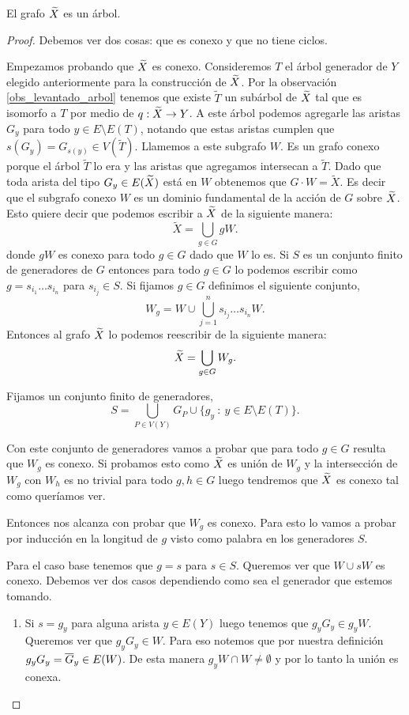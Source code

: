 \documentclass[tesis.tex]{subfiles}
\begin{document}
\begin{teo}[Serre]
	El grafo $\widetilde X$ es un árbol.
\end{teo}
\begin{proof}
	Debemos ver dos cosas: que es conexo y que no tiene ciclos.
	
	Empezamos probando que $\widetilde X$ es conexo.
	Consideremos $T$ el árbol generador de $Y$ elegido anteriormente para la construcción de $\widetilde X$. 
	Por la observación \ref{obs_levantado_arbol} tenemos que existe $\widetilde T$ un subárbol de $\widetilde X$ tal que es isomorfo a $T$ por medio de $q:\widetilde X \to Y$.
	A este árbol podemos agregarle las aristas $G_{y}$ para todo $y \in E \setminus E(T)$, notando que estas aristas cumplen que $s(G_{y}) = G_{s(y)} \in V(\widetilde T)$.
	Llamemos a este subgrafo $W$.
	Es un grafo conexo porque el árbol $\widetilde T$ lo era y las aristas que agregamos  intersecan a $\widetilde T$.	
	Dado que toda arista del tipo $G_y \in E(\widetilde X)$ está en $W$ obtenemos que $G \cdot W = \tilde X$.
	Es decir que el subgrafo conexo $W$ es un dominio fundamental de la acción de $G$ sobre $\widetilde X$.
	Esto quiere decir que podemos escribir a $\widetilde X$ de la siguiente manera:
	\[
		\tilde X = \bigcup_{g \in G} gW.
	\]
	donde $gW$ es conexo para todo $g \in G$ dado que $W$ lo es.
	Si $S$ es un conjunto finito de generadores de $G$ entonces para todo $g \in G$ lo podemos escribir como $g = s_{i_1} \dots s_{i_n}$ para $s_{i_j} \in S$.
	Si fijamos $g \in G$ definimos el siguiente conjunto,
	\[
		W_{g} = W \cup \bigcup_{j=1}^{n} s_{i_{j}}\dots s_{i_{n}}W.
	\]
	Entonces al grafo $\widetilde X$ lo podemos reescribir de la siguiente manera:
	\[
		\widetilde X =  \bigcup_{g \in G} W_{g}.
	\]
		
	
	Fijamos un conjunto finito de generadores, 
	\[
		S = \bigcup_{P \in V(Y)} G_{P} \cup \{ g_y \ : \ y \in E \setminus E(T) \}.   
	\] 
	
	Con este conjunto de generadores vamos a probar que para todo $g \in G$ resulta que $W_{g}$ es conexo.
	Si probamos esto como $\widetilde X$ es unión de $W_{g}$ y la intersección de $W_{g}$ con $W_{h}$ es no trivial para todo $g, h \in G$ luego tendremos que $\widetilde X$ es conexo tal como queríamos ver.
		
	
	Entonces nos alcanza con probar que $W_{g}$ es conexo.
	Para esto lo vamos a probar por inducción en la longitud de $g$ visto como palabra en los generadores $S$.
	
	Para el caso base tenemos que $g = s$ para $s \in S$.
	Queremos ver que $W \cup sW$ es conexo.
	Debemos ver dos casos dependiendo como sea el generador que estemos tomando.
	\begin{enumerate}
		\item Si $s=g_y$ para alguna arista $y \in E(Y)$ luego tenemos que $g_yG_y \in g_{y}W$.
		Queremos ver que $g_{y}G_{y} \in W$.
		Para eso notemos que por nuestra definición	$g_yG_y  = \overline G_y \in E(W)$.
		De esta manera $g_yW \cap W \neq \emptyset$ y por lo tanto la unión es conexa.		
		

\end{enumerate}
\end{proof}
\end{document}
